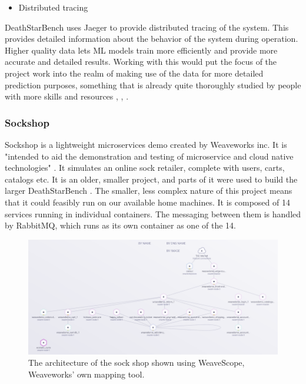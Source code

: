\begin{itemize}
    \item Distributed tracing
\end{itemize}
DeathStarBench uses Jaeger to provide distributed tracing of the system. This provides detailed information about the behavior of the system during operation. Higher quality data lets ML models train more efficiently and provide more accurate and detailed results.
Working with this would put the focus of the project work into the realm of making use of the data for more detailed prediction purposes, something that is already quite thoroughly studied by people with more skills and resources \cite*{Bogatinovski}, \cite*{Nedelkoski2019}, \cite*{Zhou2021a}.

\subsubsection{Sockshop}
Sockshop is a lightweight microservices demo created by Weaveworks inc. It is "intended to aid the demonstration and testing of microservice and cloud native technologies" \cite*{Weaveworks}. It simulates an online sock retailer, complete with users, carts, catalogs etc.
It is an older, smaller project, and parts of it were used to build the larger DeathStarBench \cite*{Gan2019}.
The smaller, less complex nature of this project means that it could feasibly run on our available home machines.
It is composed of 14 services running in individual containers. The messaging between them is handled by RabbitMQ, which runs as its own container as one of the 14.

\begin{figure}[ht]
    \centering
    \includegraphics[width=\columnwidth]{Figures/Charts/sockshop-scope_trimmed.png}
    \caption{The architecture of the sock shop shown using WeaveScope, Weaveworks' own mapping tool. \cite*{Weaveworks}}
    \label{Sockshop architecture}
\end{figure}

